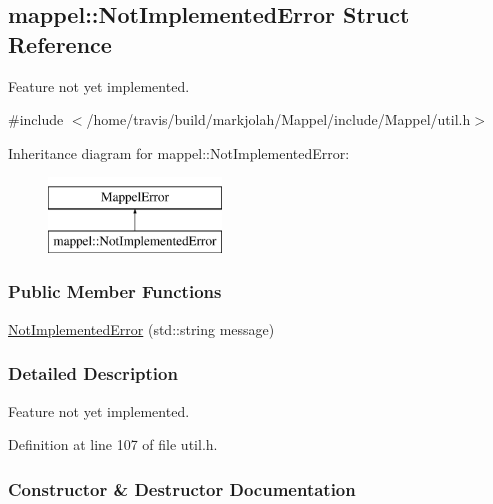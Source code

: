 \hypertarget{structmappel_1_1NotImplementedError}{}\subsection{mappel\+:\+:Not\+Implemented\+Error Struct Reference}
\label{structmappel_1_1NotImplementedError}


Feature not yet implemented.  




{\ttfamily \#include $<$/home/travis/build/markjolah/\+Mappel/include/\+Mappel/util.\+h$>$}

Inheritance diagram for mappel\+:\+:Not\+Implemented\+Error\+:\begin{figure}[H]
\begin{center}
\leavevmode
\includegraphics[height=2.000000cm]{structmappel_1_1NotImplementedError}
\end{center}
\end{figure}
\subsubsection*{Public Member Functions}
\begin{DoxyCompactItemize}
\item 
\hyperlink{structmappel_1_1NotImplementedError_a84e2fc0ea1dec71a8968da9563787118}{Not\+Implemented\+Error} (std\+::string message)
\end{DoxyCompactItemize}


\subsubsection{Detailed Description}
Feature not yet implemented. 

Definition at line 107 of file util.\+h.



\subsubsection{Constructor \& Destructor Documentation}
